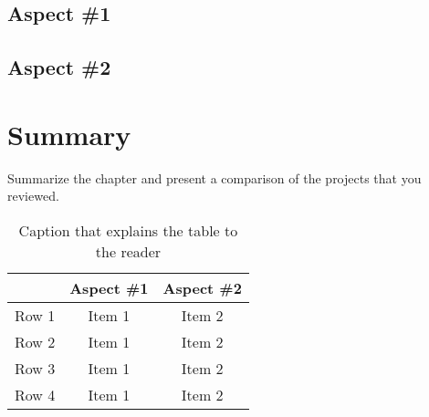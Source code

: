 \subsection{Aspect \#1}


\subsection{Aspect \#2}

\section{Summary}

Summarize the chapter and present a comparison of the projects that you reviewed.

\begin{table}[!h]
\begin{center}
	\begin{tabular}{|l|c|c|} 
	\hline
 	\bf  & \bf Aspect \#1  & \bf Aspect \#2 \\
  	\hline
	Row 1 & Item 1 & Item 2 \\
	Row 2 & Item 1 & Item 2 \\
	Row 3 & Item 1 & Item 2 \\
	Row 4 & Item 1 & Item 2 \\
	\hline
	\end{tabular}
\end{center}
\caption[Comparison of Closely-Related Projects]{Caption that explains the table to the reader}	
\label{tab:SummaryProjects}
\end{table}

